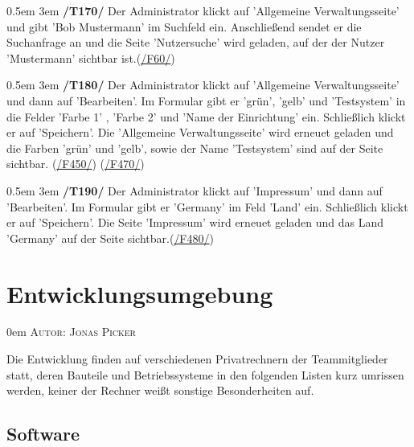 \documentclass{article}
\makeatletter
\newcommand{\sectionauthor}[1]{
	{\parindent 0em \large \scshape Autor: #1 \par \nobreak \vspace*{2em}}
	\@afterheading
}
\newcommand{\specification}[3]{
	{\parindent 0.5em \hangindent 3em \hypertarget{spec:#1:#2}{\textbf{/#1#2/}} #3 \par \nobreak \vspace*{0.5em}}
}
\makeatother
\begin{document}
\specification{T}{170}{Der Administrator klickt auf 'Allgemeine Verwaltungsseite' und gibt 'Bob Mustermann' im Suchfeld ein. Anschließend sendet er die Suchanfrage an und die Seite 'Nutzersuche' wird geladen, auf der der Nutzer 'Mustermann' sichtbar ist.(\hyperlink{spec:F:60}{/F60/})}
\specification{T}{180}{Der Administrator klickt auf 'Allgemeine Verwaltungsseite' und dann auf 'Bearbeiten'. Im Formular gibt er 'grün', 'gelb' und 'Testsystem' in die Felder 'Farbe 1' , 'Farbe 2' und 'Name der Einrichtung' ein. Schließlich klickt er auf 'Speichern'. Die 'Allgemeine Verwaltungsseite' wird erneuet geladen und die Farben 'grün' und 'gelb', sowie der Name 'Testsystem' sind auf der Seite sichtbar. (\hyperlink{spec:F:450}{/F450/}) (\hyperlink{spec:F:470}{/F470/})}
\specification{T}{190}{Der Administrator klickt auf 'Impressum' und dann auf 'Bearbeiten'. Im Formular gibt er 'Germany' im Feld 'Land' ein. Schließlich klickt er auf 'Speichern'. Die Seite 'Impressum' wird erneuet geladen und das Land 'Germany' auf der Seite sichtbar.(\hyperlink{spec:F:480}{/F480/})}

\section{Entwicklungsumgebung} %
\sectionauthor{Jonas Picker}

Die Entwicklung finden auf verschiedenen Privatrechnern der Teammitglieder statt, deren Bauteile und Betriebssysteme in den folgenden Listen kurz umrissen werden, keiner der Rechner weißt sonstige Besonderheiten auf. 

\subsection{Software}
\end{document}
